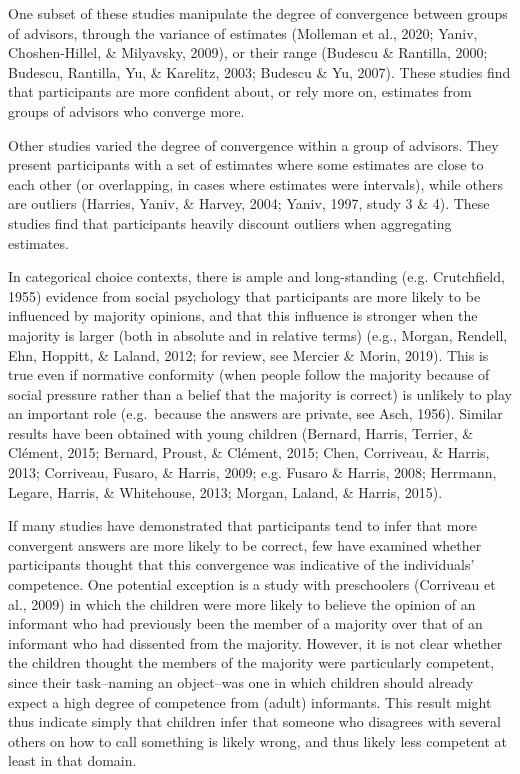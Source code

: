\documentclass[
  doc,floatsintext]{apa6}
\begin{document}
One subset of these studies manipulate the degree of convergence between groups of advisors, through the variance of estimates (Molleman et al., 2020; Yaniv, Choshen-Hillel, \& Milyavsky, 2009), or their range (Budescu \& Rantilla, 2000; Budescu, Rantilla, Yu, \& Karelitz, 2003; Budescu \& Yu, 2007). These studies find that participants are more confident about, or rely more on, estimates from groups of advisors who converge more.

Other studies varied the degree of convergence within a group of advisors. They present participants with a set of estimates where some estimates are close to each other (or overlapping, in cases where estimates were intervals), while others are outliers (Harries, Yaniv, \& Harvey, 2004; Yaniv, 1997, study 3 \& 4). These studies find that participants heavily discount outliers when aggregating estimates.

In categorical choice contexts, there is ample and long-standing (e.g. Crutchfield, 1955) evidence from social psychology that participants are more likely to be influenced by majority opinions, and that this influence is stronger when the majority is larger (both in absolute and in relative terms) (e.g., Morgan, Rendell, Ehn, Hoppitt, \& Laland, 2012; for review, see Mercier \& Morin, 2019). This is true even if normative conformity (when people follow the majority because of social pressure rather than a belief that the majority is correct) is unlikely to play an important role (e.g.~because the answers are private, see Asch, 1956). Similar results have been obtained with young children (Bernard, Harris, Terrier, \& Clément, 2015; Bernard, Proust, \& Clément, 2015; Chen, Corriveau, \& Harris, 2013; Corriveau, Fusaro, \& Harris, 2009; e.g. Fusaro \& Harris, 2008; Herrmann, Legare, Harris, \& Whitehouse, 2013; Morgan, Laland, \& Harris, 2015).

If many studies have demonstrated that participants tend to infer that more convergent answers are more likely to be correct, few have examined whether participants thought that this convergence was indicative of the individuals' competence. One potential exception is a study with preschoolers (Corriveau et al., 2009) in which the children were more likely to believe the opinion of an informant who had previously been the member of a majority over that of an informant who had dissented from the majority. However, it is not clear whether the children thought the members of the majority were particularly competent, since their task--naming an object--was one in which children should already expect a high degree of competence from (adult) informants. This result might thus indicate simply that children infer that someone who disagrees with several others on how to call something is likely wrong, and thus likely less competent at least in that domain.
\end{document}
